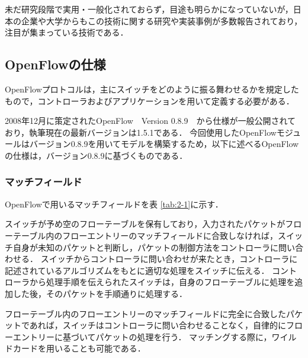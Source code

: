 未だ研究段階で実用・一般化されておらず，目途も明らかになっていないが，日本の企業や大学からもこの技術に関する研究や実装事例が多数報告されており，注目が集まっている技術である．

\subsection{OpenFlowの仕様}

OpenFlowプロトコルは，主にスイッチをどのように振る舞わせるかを規定したもので，コントローラおよびアプリケーションを用いて定義する必要がある．

2008年12月に策定されたOpenFlow　Version 0.8.9\cite{openflow}　から仕様が一般公開されており，執筆現在の最新バージョンは1.5.1である．
今回使用したOpenFlowモジュールはバージョン0.8.9を用いてモデルを構築するため，以下に述べるOpenFlowの仕様は，バージョン0.8.9に基づくものである．

\subsubsection{マッチフィールド}

OpenFlowで用いるマッチフィールドを表 \ref{tab:2-1}に示す\cite{openflow}．

スイッチが予め空のフローテーブルを保有しており，入力されたパケットがフローテーブル内のフローエントリーのマッチフィールドに合致しなければ，スイッチ自身が未知のパケットと判断し，パケットの制御方法をコントローラに問い合わせる．
スイッチからコントローラに問い合わせが来たとき，コントローラに記述されているアルゴリズムをもとに適切な処理をスイッチに伝える．
コントローラから処理手順を伝えられたスイッチは，自身のフローテーブルに処理を追加した後，そのパケットを手順通りに処理する．

フローテーブル内のフローエントリーのマッチフィールドに完全に合致したパケットであれば，スイッチはコントローラに問い合わせることなく，自律的にフローエントリーに基づいてパケットの処理を行う．
マッチングする際に，ワイルドカードを用いることも可能である．

